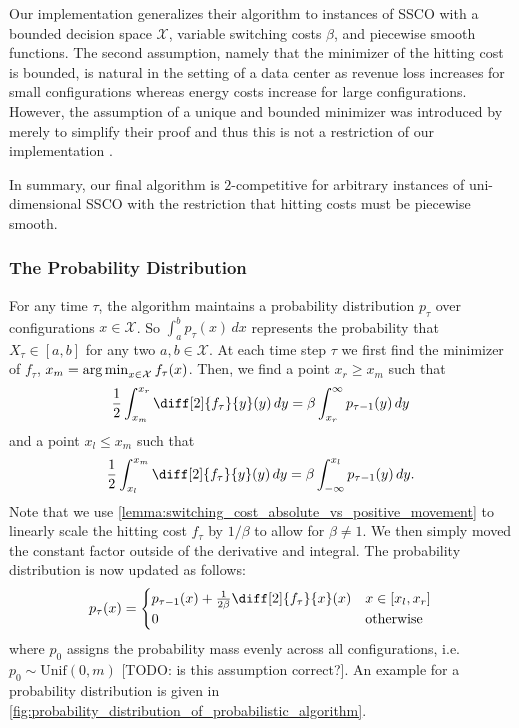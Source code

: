 Our implementation generalizes their algorithm to instances of SSCO with a bounded decision space $\mathcal{X}$, variable switching costs $\beta$, and piecewise smooth functions. The second assumption, namely that the minimizer of the hitting cost is bounded, is natural in the setting of a data center as revenue loss increases for small configurations whereas energy costs increase for large configurations. However, the assumption of a unique and bounded minimizer was introduced by \citeauthor*{Bansal2015} merely to simplify their proof and thus this is not a restriction of our implementation \cite{Bansal2015}.

In summary, our final algorithm is $2$-competitive for arbitrary instances of uni-dimensional SSCO with the restriction that hitting costs must be piecewise smooth.

\subsubsection{The Probability Distribution}

For any time $\tau$, the algorithm maintains a probability distribution $p_{\tau}$ over configurations $x \in \mathcal{X}$. So $\int_a^b p_{\tau}(x) \,dx$ represents the probability that $X_{\tau} \in [a,b]$ for any two $a, b \in \mathcal{X}$. At each time step $\tau$ we first find the minimizer of $f_{\tau}$, $x_m = \operatorname*{arg\,min}_{x \in \mathcal{X}} f_{\tau}(x)$. Then, we find a point $x_r \geq x_m$ such that \begin{align}\label{eq:ud:probabilistic:right}
    \frac{1}{2} \int_{x_m}^{x_r} \diff[2]{f_{\tau}}{y}(y) \,dy = \beta \int_{x_r}^{\infty} p_{\tau-1}(y) \,dy
\end{align} and a point $x_l \leq x_m$ such that \begin{align}\label{eq:ud:probabilistic:left}
    \frac{1}{2} \int_{x_l}^{x_m} \diff[2]{f_{\tau}}{y}(y) \,dy = \beta \int_{-\infty}^{x_l} p_{\tau-1}(y) \,dy.
\end{align} Note that we use \autoref{lemma:switching_cost_absolute_vs_positive_movement} to linearly scale the hitting cost $f_{\tau}$ by $1 / \beta$ to allow for $\beta \neq 1$. We then simply moved the constant factor outside of the derivative and integral. The probability distribution is now updated as follows: \begin{align}\label{eq:ud:probabilistic:update}
    p_{\tau}(x) = \begin{cases}
        p_{\tau-1}(x) + \frac{1}{2 \beta} \diff[2]{f_{\tau}}{x}(x) & x \in [x_l,x_r] \\
        0 & \text{otherwise}
    \end{cases}
\end{align} where $p_0$ assigns the probability mass evenly across all configurations, i.e. $p_0 \sim \text{Unif}(0, m)$ [TODO: is this assumption correct?]. An example for a probability distribution is given in \autoref{fig:probability_distribution_of_probabilistic_algorithm}.

